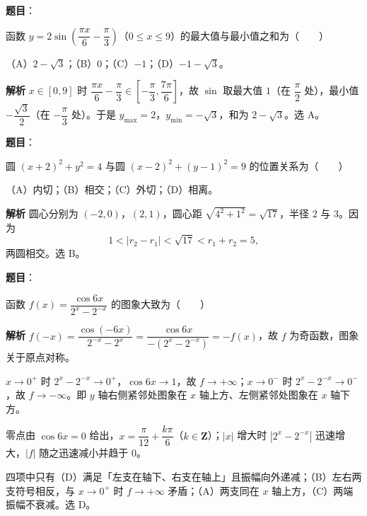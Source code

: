 \begin{answer}

\textbf{题目}：

函数 $y=2\sin\left(\dfrac{\pi x}6-\dfrac\pi3\right)$（$0\leqslant x\leqslant9$）的最大值与最小值之和为\mbox{（　　）}

（A）$2-\sqrt3$；（B）$0$；（C）$-1$；（D）$-1-\sqrt3$。

\textbf{解析}
$x\in[0,9]$ 时 $\dfrac{\pi x}6-\dfrac\pi3\in\left[-\dfrac\pi3,\dfrac{7\pi}6\right]$，故 $\sin$ 取最大值 $1$（在 $\dfrac\pi2$ 处），最小值 $-\dfrac{\sqrt3}2$（在 $-\dfrac\pi3$ 处）。于是 $y_{\max}=2$，$y_{\min}=-\sqrt3$，和为 $2-\sqrt3$。选 A。


\end{answer}
\begin{answer}

\textbf{题目}：

圆 $(x+2)^2+y^2=4$ 与圆 $(x-2)^2+(y-1)^2=9$ 的位置关系为\mbox{（　　）}

（A）内切；（B）相交；（C）外切；（D）相离。

\textbf{解析}
圆心分别为 $(-2,0)$，$(2,1)$，圆心距 $\sqrt{4^2+1^2}=\sqrt{17}$，半径 $2$ 与 $3$。因为
\nopagebreak[4]
\[1<|r_2-r_1|<\sqrt{17}<r_1+r_2=5,\]
两圆相交。选 B。


\end{answer}
\begin{answer}

\textbf{题目}：

函数 $f(x)=\dfrac{\cos6x}{2^x-2^{-x}}$ 的图象大致为\mbox{（　　）}
\nopagebreak[4]
\begin{center}\end{center}
\nopagebreak[4]
\textbf{解析}
$f(-x)=\dfrac{\cos(-6x)}{2^{-x}-2^x}=\dfrac{\cos6x}{-(2^x-2^{-x})}=-f(x)$，故 $f$ 为奇函数，图象关于原点对称。

$x\to0^+$ 时 $2^x-2^{-x}\to0^+$，$\cos6x\to1$，故 $f\to+\infty$；$x\to0^-$ 时 $2^x-2^{-x}\to0^-$，故 $f\to-\infty$。即 $y$ 轴右侧紧邻处图象在 $x$ 轴上方、左侧紧邻处图象在 $x$ 轴下方。

零点由 $\cos6x=0$ 给出，$x=\dfrac\pi{12}+\dfrac{k\pi}6$（$k\in\mathbf Z$）；$|x|$ 增大时 $|2^x-2^{-x}|$ 迅速增大，$|f|$ 随之迅速减小并趋于 $0$。

四项中只有（D）满足「左支在轴下、右支在轴上」且振幅向外递减；（B）左右两支符号相反，与 $x\to0^+$ 时 $f\to+\infty$ 矛盾；（A）两支同在 $x$ 轴上方，（C）两端振幅不衰减。选 D。


\end{answer}
